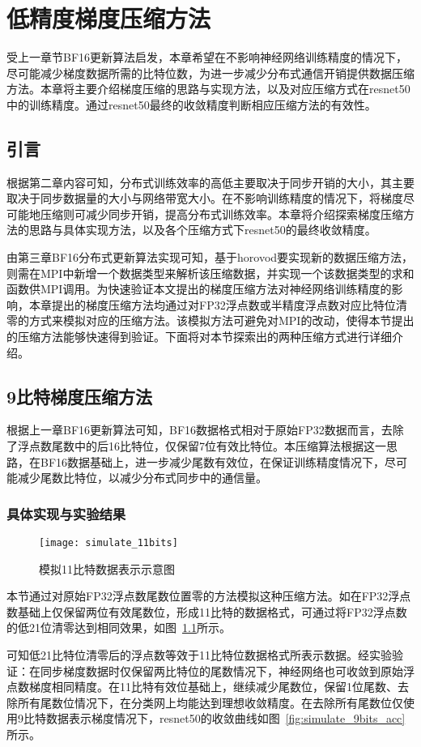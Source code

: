 \chapter{低精度梯度压缩方法}
受上一章节BF16更新算法启发，本章希望在不影响神经网络训练精度的情况下，尽可能减少梯度数据所需的比特位数，为进一步减少分布式通信开销提供数据压缩方法。本章将主要介绍梯度压缩的思路与实现方法，以及对应压缩方式在resnet50中的训练精度。通过resnet50最终的收敛精度判断相应压缩方法的有效性。
\section{引言}
根据第二章内容可知，分布式训练效率的高低主要取决于同步开销的大小，其主要取决于同步数据量的大小与网络带宽大小。在不影响训练精度的情况下，将梯度尽可能地压缩则可减少同步开销，提高分布式训练效率。本章将介绍探索梯度压缩方法的思路与具体实现方法，以及各个压缩方式下resnet50的最终收敛精度。

由第三章BF16分布式更新算法实现可知，基于horovod要实现新的数据压缩方法，则需在MPI中新增一个数据类型来解析该压缩数据，并实现一个该数据类型的求和函数供MPI调用。为快速验证本文提出的梯度压缩方法对神经网络训练精度的影响，本章提出的梯度压缩方法均通过对FP32浮点数或半精度浮点数对应比特位清零的方式来模拟对应的压缩方法。该模拟方法可避免对MPI的改动，使得本节提出的压缩方法能够快速得到验证。下面将对本节探索出的两种压缩方式进行详细介绍。
\section{9比特梯度压缩方法}
根据上一章BF16更新算法可知，BF16数据格式相对于原始FP32数据而言，去除了浮点数尾数中的后16比特位，仅保留7位有效比特位。本压缩算法根据这一思路，在BF16数据基础上，进一步减少尾数有效位，在保证训练精度情况下，尽可能减少尾数比特位，以减少分布式同步中的通信量。

\subsection{具体实现与实验结果}
\begin{figure}[htp]
\centering
\texttt{[image: simulate\_11bits]}
\caption{模拟11比特数据表示示意图}
\label{fig:simulate_11bits}
\end{figure}
本节通过对原始FP32浮点数尾数位置零的方法模拟这种压缩方法。如在FP32浮点数基础上仅保留两位有效尾数位，形成11比特的数据格式，可通过将FP32浮点数的低21位清零达到相同效果，如图~\ref{fig:simulate_11bits}所示。

可知低21比特位清零后的浮点数等效于11比特位数据格式所表示数据。经实验验证：在同步梯度数据时仅保留两比特位的尾数情况下，神经网络也可收敛到原始浮点数梯度相同精度。在11比特有效位基础上，继续减少尾数位，保留1位尾数、去除所有尾数位情况下，在分类网上均能达到理想收敛精度。在去除所有尾数位仅使用9比特数据表示梯度情况下，resnet50的收敛曲线如图~\ref{fig:simulate_9bits_acc}所示。

